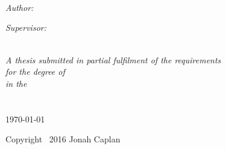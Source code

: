 \documentclass[
12pt, %
oneside, %
english, %
doublespacing, %
]{MastersDoctoralThesis} %
\begin{document}
\begin{titlepage}
\begin{center}
\begin{minipage}{0.2\textwidth}
\begin{flushright}
\end{flushright}
\end{minipage}
\vspace{1cm}

\HRule \\[0.4cm] %
{\huge \bfseries \ttitle}\\[0.4cm] %
\HRule \\[1.5cm] %
 
\begin{minipage}{0.4\textwidth}
\begin{flushleft} \large
\emph{Author:}\\
\authorname %
\end{flushleft}
\end{minipage}
\begin{minipage}{0.4\textwidth}
\begin{flushright} \large
\emph{Supervisor:} \\
\supname %
\end{flushright}
\end{minipage}\\[3cm]
 
\large \textit{A thesis submitted in partial fulfilment of the requirements\\ for the degree of \degreename}\\[0.3cm] %
\textit{in the}\\[0.4cm]
\groupname\\\deptname\\[2cm] %
 
{\large \today}\\[4cm] %
 
\vfill


Copyright \textsf{\textcopyright} \ 2016 Jonah Caplan

\end{center}

\end{titlepage}



\end{document}
